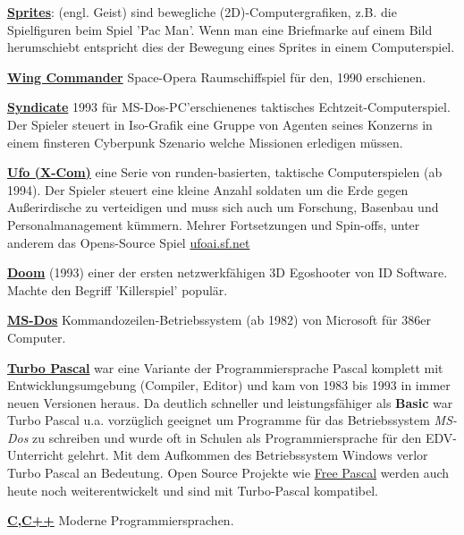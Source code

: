 \href{https://de.wikipedia.org/wiki/Sprite_(Computergrafik)}{\textbf{Sprites}}: (engl. Geist) sind bewegliche (2D)-Computergrafiken, z.B. die Spielfiguren beim Spiel 'Pac Man'.  Wenn man eine Briefmarke auf einem Bild herumschiebt entspricht dies der Bewegung eines Sprites in einem Computerspiel.

\href{https://de.wikipedia.org/wiki/Wing_Commander_(Computerspiel)}{\textbf{Wing Commander}} Space-Opera Raumschiffspiel für den, 1990 erschienen.

\href{https://de.wikipedia.org/wiki/Syndicate}{\textbf{Syndicate}} 1993 für MS-Dos-PC'erschienenes taktisches Echtzeit-Computerspiel. Der Spieler steuert in Iso-Grafik eine Gruppe von Agenten seines Konzerns in einem finsteren Cyberpunk Szenario welche Missionen erledigen müssen.

\href{https://de.wikipedia.org/wiki/X-COM}{\textbf{Ufo (X-Com)}} eine Serie von runden-basierten, taktische Computerspielen (ab 1994). Der Spieler steuert eine  kleine Anzahl soldaten um die Erde gegen Außerirdische zu verteidigen und muss sich auch um Forschung, Basenbau und Personalmanagement kümmern. Mehrer Fortsetzungen und Spin-offs, unter anderem das Opens-Source Spiel \url{ufoai.sf.net}

\href{https://de.wikipedia.org/wiki/Doom}{\textbf{Doom}} (1993) einer der ersten netzwerkfähigen 3D Egoshooter von ID Software. Machte den Begriff 'Killerspiel' populär.

\href{https://de.wikipedia.org/wiki/MS_DOS}{\textbf{MS-Dos}} Kommandozeilen-Betriebssystem (ab 1982) von Microsoft für 386er Computer. 

\href{https://de.wikipedia.org/wiki/Turbo_Pascal}{\textbf{Turbo Pascal}} war eine Variante der Programmiersprache Pascal komplett mit Entwicklungsumgebung (Compiler, Editor) und kam von 1983 bis 1993 in immer neuen Versionen heraus. Da deutlich schneller und leistungsfähiger als \textbf{Basic} war Turbo Pascal u.a. vorzüglich geeignet um Programme für das Betriebssystem \textit{MS-Dos} zu schreiben und wurde oft in Schulen als Programmiersprache für den EDV-Unterricht gelehrt. Mit dem Aufkommen des Betriebssystem Windows verlor Turbo Pascal an Bedeutung. Open Source Projekte wie \href{https://de.wikipedia.org/wiki/Free_Pascal}{Free Pascal} werden auch heute noch weiterentwickelt und sind mit  Turbo-Pascal kompatibel.

\href{https://de.wikipedia.org/wiki/C_(Programmiersprache)}{\textbf{C,C++}} Moderne Programmiersprachen.

